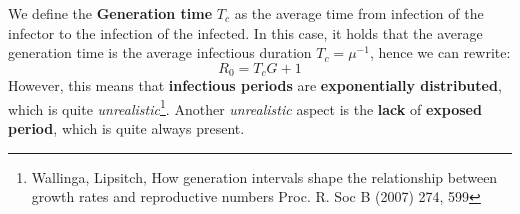 \documentclass[../main/main.tex]{subfiles}
\begin{document}
\begin{figure}[h!]
\begin{minipage}[c]{0.5\linewidth}
\end{minipage}
\begin{minipage}[]{0.5\linewidth}
\centering
{}
\end{minipage}
\caption{\label{fig:21_06}}
\end{figure}


We define the \textbf{Generation time} $T_c$ as the average time from infection of the infector to the infection of the infected. In this case, it holds that the average generation time is the average infectious duration $T_c = \mu^{-1}$, hence we can rewrite:
\begin{equation}
    R_0 = T_c G + 1
\end{equation}
However, this means that \textbf{infectious periods} are \textbf{exponentially distributed}, which is quite \textit{unrealistic}\footnote{Wallinga, Lipsitch, How generation intervals shape the relationship between growth rates and reproductive numbers Proc. R. Soc B (2007) 274, 599}. Another \textit{unrealistic} aspect is the \textbf{lack} of \textbf{exposed period}, which is quite always present.
\end{document}
